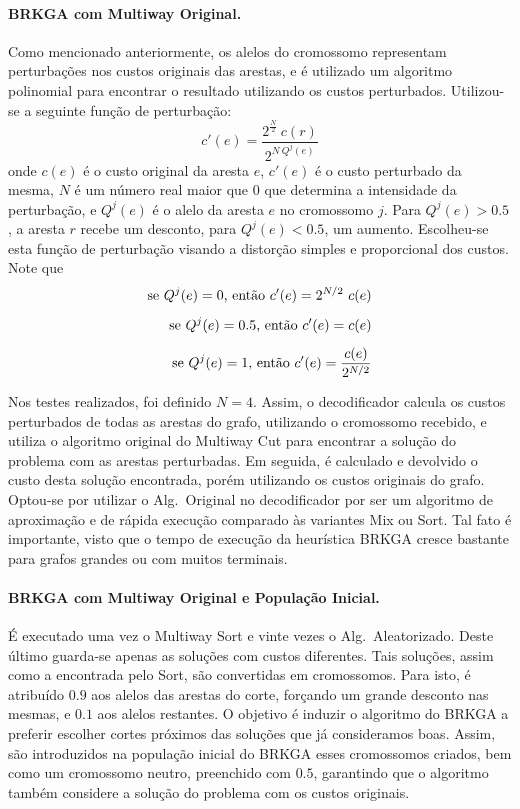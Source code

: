 \documentclass[12pt, a4paper]{article}
\begin{document}
\paragraph{BRKGA com Multiway Original.} Como mencionado anteriormente, os alelos do cromossomo representam perturbações nos custos originais das arestas, e é utilizado um algoritmo polinomial para encontrar o resultado utilizando os custos perturbados. Utilizou-se a seguinte função de perturbação:
\[ 
    c'(e) = \frac{2^{\frac{N}{2}}\ c(r)}{2^{N\ Q^j(e)}}
\]
onde $c(e)$ é o custo original da aresta $e$, $c'(e)$ é o custo perturbado da mesma, $N$ é um número real maior que $0$ que determina a intensidade da perturbação, e $Q^j(e)$ é o alelo da aresta $e$ no cromossomo $j$. Para $Q^j(e) > 0.5$, a aresta $r$ recebe um desconto, para $Q^j(e) < 0.5$, um aumento.
Escolheu-se esta função de perturbação visando a distorção simples e proporcional dos custos. Note que
\begin{equation*}
\setlength{\jot}{8pt}
    \begin{aligned}
        \text{se } Q^j(e) = 0\text{, então } c'(e) = 2^{N/2}\ c(e) \\
        \text{se } Q^j(e) = 0.5\text{, então } c'(e) = c(e) \\
        \text{se } Q^j(e) = 1\text{, então } c'(e) = \frac{c(e)}{2^{N/2}}
    \end{aligned}
\end{equation*}

Nos testes realizados, foi definido $N = 4$.
Assim, o decodificador calcula os custos perturbados de todas as arestas do grafo, utilizando o cromossomo recebido, e utiliza o algoritmo original do Multiway Cut para encontrar a solução do problema com as arestas perturbadas. Em seguida, é calculado e devolvido o custo desta solução encontrada, porém utilizando os custos originais do grafo.
Optou-se por utilizar o Alg.\ Original no decodificador por ser um algoritmo de aproximação e de rápida execução comparado às variantes Mix ou Sort. Tal fato é importante, visto que o tempo de execução da heurística BRKGA cresce bastante para grafos grandes ou com muitos terminais.

\paragraph{BRKGA com Multiway Original e População Inicial.} É executado uma vez o Multiway Sort e vinte vezes o Alg.\ Aleatorizado. Deste último guarda-se apenas as soluções com custos diferentes. Tais soluções, assim como a encontrada pelo Sort, são convertidas em cromossomos. Para isto, é atribuído $0.9$ aos alelos das arestas do corte, forçando um grande desconto nas mesmas, e $0.1$ aos alelos restantes. O objetivo é induzir o algoritmo do BRKGA a preferir escolher cortes próximos das soluções que já consideramos boas. Assim, são introduzidos na população inicial do BRKGA esses cromossomos criados, bem como um cromossomo neutro, preenchido com $0.5$, garantindo que o algoritmo também considere a solução do problema com os custos originais.
\end{document}
